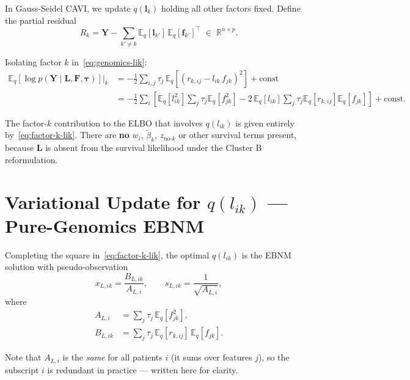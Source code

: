 \documentclass[11pt]{article}
\newcommand{\E}{\mathbb{E}}
\begin{document}
In Gauss-Seidel CAVI, we update $q(\mathbf{l}_k)$ holding all other factors fixed.
Define the partial residual
\begin{equation}
  R_{k} = \mathbf{Y} - \sum_{k' \ne k} \E_q[\mathbf{l}_{k'}]\,\E_q[\mathbf{f}_{k'}]^\top
        \;\in\; \mathbb{R}^{n \times p}.
\end{equation}

Isolating factor $k$ in~\eqref{eq:genomics-lik}:
\begin{align}
  \E_q[\log p(\mathbf{Y} \mid \mathbf{L}, \mathbf{F}, \boldsymbol{\tau})] \Big|_k
  &= -\frac{1}{2}\sum_{i,j} \tau_j \,\E_q[(r_{k,ij} - l_{ik}\,f_{jk})^2] + \text{const} \nonumber\\
  &= -\frac{1}{2}\sum_{i} \left[
       \E_q[l_{ik}^2]\sum_j \tau_j \E_q[f_{jk}^2]
       - 2\,\E_q[l_{ik}]\sum_j \tau_j \E_q[r_{k,ij}]\E_q[f_{jk}]
     \right] + \text{const}.
  \label{eq:factor-k-lik}
\end{align}

\begin{verifybox}
The factor-$k$ contribution to the ELBO that involves $q(l_{ik})$ is given
entirely by~\eqref{eq:factor-k-lik}. There are \textbf{no} $w_i$, $\tilde{\beta}_k$,
$z_{\text{no-}k}$ or other survival terms present, because $\mathbf{L}$ is absent from
the survival likelihood under the Cluster B reformulation.
\end{verifybox}

\section{Variational Update for $q(l_{ik})$ — Pure-Genomics EBNM}

Completing the square in~\eqref{eq:factor-k-lik}, the optimal $q(l_{ik})$ is the EBNM
solution with pseudo-observation
\begin{equation}
  x_{L,ik} = \frac{B_{L,ik}}{A_{L,i}}, \qquad
  s_{L,ik} = \frac{1}{\sqrt{A_{L,i}}},
\end{equation}
where
\begin{align}
  A_{L,i} &= \sum_j \tau_j\,\E_q[f_{jk}^2], \label{eq:AL-gen}\\[4pt]
  B_{L,ik} &= \sum_j \tau_j\,\E_q[r_{k,ij}]\,\E_q[f_{jk}]. \label{eq:BL-gen}
\end{align}

Note that $A_{L,i}$ is the \emph{same} for all patients $i$ (it sums over features $j$),
so the subscript $i$ is redundant in practice — written here for clarity.
\end{document}
